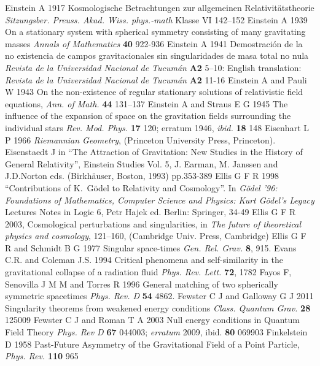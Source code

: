 \documentclass[12pt]{iopart}
\begin{document}
\begin{thebibliography}{999}
 Einstein A 1917 Kosmologische Betrachtungen zur allgemeinen Relativit\"atstheorie {\it Sitzungsber. Preuss. Akad. Wiss. phys.-math} Klasse VI 142--152
 Einstein A 1939 On a 
stationary system with spherical symmetry consisting of many 
gravitating masses {\it Annals of Mathematics} {\bf 40} 922-936
 Einstein A 1941 Demostraci\'on de la no existencia de campos gravitacionales sin singularidades de masa total no nula {\it Revista de la Universidad Nacional de Tucum\'an} {\bf A2} 5--10: English translation:
{\it Revista de la Universidad Nacional de Tucum\'an} {\bf A2} 11-16
 Einstein A and Pauli W 1943 On the non-existence of regular stationary solutions of relativistic field equations, {\it Ann. of Math.}  {\bf 44}  131--137
 Einstein A and Straus E G 1945 The influence of the expansion of space on the gravitation fields surrounding the individual stars {\it Rev. Mod. Phys.} {\bf 17} 120; erratum 1946, {\it ibid.} {\bf 18} 148
 Eisenhart L P 1966 {\it Riemannian Geometry}, (Princeton University Press, Princeton).
 Eisenstaedt J in ``The Attraction of Gravitation: New Studies in
the History of General Relativity'', Einstein Studies Vol. 5, J. Earman, M.
Janssen and J.D.Norton eds. (Birkh\"auser, Boston, 1993) pp.353-389%
 Ellis G F R 1998 ``Contributions 
of K.\ G\"odel to Relativity and Cosmology''. In {\it G\"odel '96: 
Foundations of Mathematics, Computer Science and Physics: Kurt 
G\"odel's Legacy} Lectures Notes in Logic 6, Petr Hajek ed. Berlin: 
Springer, 34-49
 Ellis G F R 2003, Cosmological perturbations and singularities, in {\it The future of theoretical physics and cosmology}, 121--160, (Cambridge Univ. Press, Cambridge)
 Ellis G F R and Schmidt B G 1977 Singular space-times  {\it Gen. Rel. Grav.} {\bf 8},
915.%
 Evans C.R. and Coleman J.S. 1994 Critical phenomena and self-similarity in the gravitational collapse of a radiation fluid {\it Phys. Rev. Lett.} {\bf 72}, 1782
 Fayos F, Senovilla J M M and Torres R 1996 General matching of two spherically symmetric spacetimes
{\it Phys. Rev. D} {\bf 54} 4862.
 Fewster C J and Galloway G J 2011 Singularity theorems from weakened energy conditions  {\it Class. Quantum Grav.} {\bf 28} 125009
 Fewster C J and Roman T A 2003 Null energy conditions in Quantum Field Theory {\it Phys. Rev D} {\bf 67} 044003; {\it erratum} 2009, ibid. {\bf 80} 069903
 Finkelstein D 1958 Past-Future Asymmetry of the Gravitational Field of a Point Particle, {\it Phys. Rev.} {\bf 110} 965

\end{thebibliography}
\end{document}
